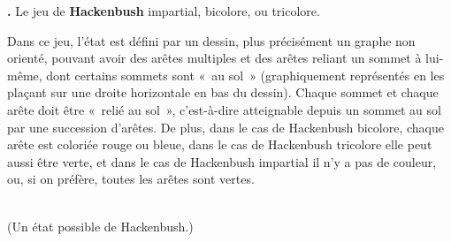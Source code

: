 \documentclass[12pt,a4paper]{article}
\theoremstyle{definition}
\newcommand\thingy{%
\refstepcounter{comcnt}\smallskip\noindent\textbf{\thecomcnt.} }
\newcommand{\defin}[2][]{\def\latexsucks{#1}\ifx\latexsucks\empty\index{#2}\else\index{\latexsucks}\fi\textbf{#2}}
\begin{document}
\thingy\label{introduction-hackenbush} Le jeu de \defin{Hackenbush}
impartial, bicolore, ou tricolore.

Dans ce jeu, l'état est défini par un dessin, plus précisément un
graphe non orienté, pouvant avoir des arêtes multiples et des arêtes
reliant un sommet à lui-même, dont certains sommets sont « au sol »
(graphiquement représentés en les plaçant sur une droite horizontale
en bas du dessin).  Chaque sommet et chaque arête doit être « relié au
  sol », c'est-à-dire atteignable depuis un sommet au sol par une
succession d'arêtes.  De plus, dans le cas de Hackenbush bicolore,
chaque arête est coloriée rouge ou bleue, dans le cas de Hackenbush
tricolore elle peut aussi être verte, et dans le cas de Hackenbush
impartial il n'y a pas de couleur, ou, si on préfère, toutes les
arêtes sont vertes.

\begin{center}
\\{\footnotesize (Un état possible de Hackenbush.)}
\end{center}
\end{document}
